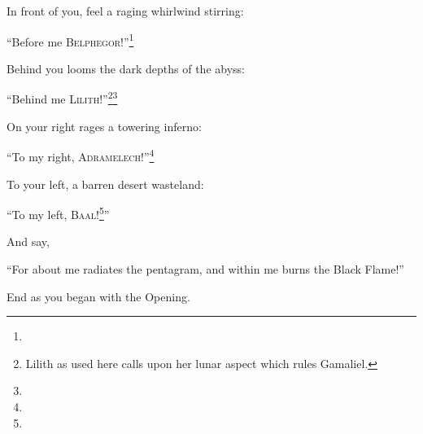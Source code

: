  In front of you, feel a raging whirlwind stirring:\begin{quoting}\enquote{Before me \textsc{Belphegor}!}\footnote{}\end{quoting}

 Behind you looms the dark depths of the abyss:\begin{quoting}\enquote{Behind me \textsc{Lilith}!}\footnote{Lilith as used here calls upon her lunar aspect which rules Gamaliel.}\footnote{}\end{quoting}

 On your right rages a towering inferno: \begin{quoting}\enquote{To my right, \textsc{Adramelech}!}\footnote{}\end{quoting}

 To your left, a barren desert wasteland: \begin{quoting}\enquote{To my left, \textsc{Baal}!\footnote{}}\end{quoting}

 And say, \begin{quoting}\enquote{For about me radiates the pentagram, and within me burns the Black Flame!}\end{quoting}

End as you began with the Opening.

